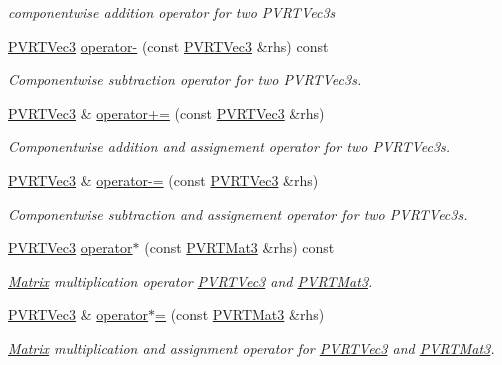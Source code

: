 \begin{DoxyCompactItemize}
\begin{DoxyCompactList}\small\item\em componentwise addition operator for two P\+V\+R\+T\+Vec3s \end{DoxyCompactList}\item 
\hyperlink{struct_p_v_r_t_vec3}{P\+V\+R\+T\+Vec3} \hyperlink{struct_p_v_r_t_vec3_a5427cba3adf198eac6ffcd836a1d3c22}{operator-\/} (const \hyperlink{struct_p_v_r_t_vec3}{P\+V\+R\+T\+Vec3} \&rhs) const 
\begin{DoxyCompactList}\small\item\em Componentwise subtraction operator for two P\+V\+R\+T\+Vec3s. \end{DoxyCompactList}\item 
\hyperlink{struct_p_v_r_t_vec3}{P\+V\+R\+T\+Vec3} \& \hyperlink{struct_p_v_r_t_vec3_a87115ce68d9d20e0012e080adbb9d290}{operator+=} (const \hyperlink{struct_p_v_r_t_vec3}{P\+V\+R\+T\+Vec3} \&rhs)
\begin{DoxyCompactList}\small\item\em Componentwise addition and assignement operator for two P\+V\+R\+T\+Vec3s. \end{DoxyCompactList}\item 
\hyperlink{struct_p_v_r_t_vec3}{P\+V\+R\+T\+Vec3} \& \hyperlink{struct_p_v_r_t_vec3_a9f8dc316c312fdeb3f6dc5c4662d4c87}{operator-\/=} (const \hyperlink{struct_p_v_r_t_vec3}{P\+V\+R\+T\+Vec3} \&rhs)
\begin{DoxyCompactList}\small\item\em Componentwise subtraction and assignement operator for two P\+V\+R\+T\+Vec3s. \end{DoxyCompactList}\item 
\hyperlink{struct_p_v_r_t_vec3}{P\+V\+R\+T\+Vec3} \hyperlink{struct_p_v_r_t_vec3_a7b17016385e97edeb54532f7b85cc405}{operator$\ast$} (const \hyperlink{struct_p_v_r_t_mat3}{P\+V\+R\+T\+Mat3} \&rhs) const 
\begin{DoxyCompactList}\small\item\em \hyperlink{class_matrix}{Matrix} multiplication operator \hyperlink{struct_p_v_r_t_vec3}{P\+V\+R\+T\+Vec3} and \hyperlink{struct_p_v_r_t_mat3}{P\+V\+R\+T\+Mat3}. \end{DoxyCompactList}\item 
\hyperlink{struct_p_v_r_t_vec3}{P\+V\+R\+T\+Vec3} \& \hyperlink{struct_p_v_r_t_vec3_aa44d0c92dc26d0cf116540fcf2c180e0}{operator$\ast$=} (const \hyperlink{struct_p_v_r_t_mat3}{P\+V\+R\+T\+Mat3} \&rhs)
\begin{DoxyCompactList}\small\item\em \hyperlink{class_matrix}{Matrix} multiplication and assignment operator for \hyperlink{struct_p_v_r_t_vec3}{P\+V\+R\+T\+Vec3} and \hyperlink{struct_p_v_r_t_mat3}{P\+V\+R\+T\+Mat3}. \end{DoxyCompactList}\item 

\end{DoxyCompactItemize}
